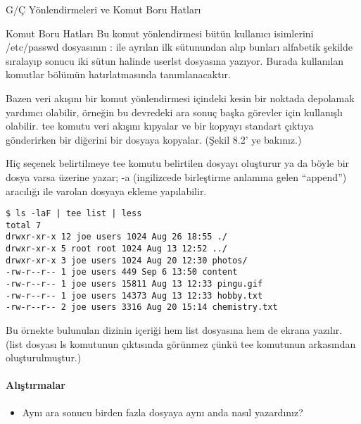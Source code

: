 \begin{section}{G/Ç Yönlendirmeleri ve Komut Boru Hatları}
\begin{subsection}{Komut Boru Hatları}
Bu komut yönlendirmesi bütün kullanıcı isimlerini /etc/passwd dosyasının : ile ayrılan ilk sütunundan alıp bunları alfabetik şekilde sıralayıp sonucu iki sütun halinde userlst dosyasına yazıyor. Burada kullanılan komutlar bölümün hatırlatmasında tanımlanacaktır.

Bazen veri akışını bir komut yönlendirmesi içindeki kesin bir noktada depolamak yardımcı olabilir, örneğin bu devredeki ara sonuç başka görevler için kullanışlı olabilir. tee komutu veri akışını kıpyalar ve bir kopyayı standart çıktıya gönderirken bir diğerini bir dosyaya kopyalar. (Şekil 8.2' ye bakınız.)

Hiç seçenek belirtilmeye tee komutu belirtilen dosyayı oluşturur ya da böyle bir dosya varsa üzerine yazar; -a (ingilizcede birleştirme anlamına gelen “append”) aracılığı ile varolan dosyaya ekleme yapılabilir.
\begin{verbatim}
$ ls -laF | tee list | less
total 7
drwxr-xr-x 12 joe users 1024 Aug 26 18:55 ./
drwxr-xr-x 5 root root 1024 Aug 13 12:52 ../
drwxr-xr-x 3 joe users 1024 Aug 20 12:30 photos/
-rw-r--r-- 1 joe users 449 Sep 6 13:50 content
-rw-r--r-- 1 joe users 15811 Aug 13 12:33 pingu.gif
-rw-r--r-- 1 joe users 14373 Aug 13 12:33 hobby.txt
-rw-r--r-- 2 joe users 3316 Aug 20 15:14 chemistry.txt
\end{verbatim}

Bu örnekte bulunulan dizinin içeriği hem list dosyasına hem de ekrana yazılır. (list dosyası ls komutunun çıktısında görünmez çünkü tee komutunun arkasından oluşturulmuştur.)

\paragraph{Alıştırmalar}{
\begin{itemize}
 \item Aynı ara sonucu birden fazla dosyaya aynı anda nasıl yazardınız?
\end{itemize}}
\end{subsection}
\end{section}
